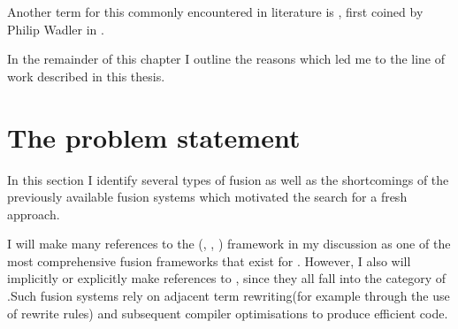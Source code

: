 \documentclass[preamble.tex]{subfiles}
\begin{document}
Another term for this commonly encountered in literature is , first coined by Philip Wadler in \cite{Wad90}.


In the remainder of this chapter I outline the reasons which led me to the line of work described in this thesis.








\clearpage
\section{The problem statement}

In this section I identify several types of fusion as well as the shortcomings of the previously available fusion systems which motivated the search for a fresh approach.

I will make many references to the \StreamFusion\istreamfusion (\cite{CLS07}, \cite{CSL06}, \cite{VectorStreamFusion}) framework in my discussion as one of the most comprehensive fusion frameworks that exist for \Haskell. However, I also will implicitly or explicitly make references to  \cite{GLP93},  \cite{CK01} since they all fall into the category of .\ieqfusion Such fusion systems rely on adjacent term rewriting\irw (for example through the use of rewrite rules\irwrules \cite{PTH01}) and subsequent compiler optimisations to produce efficient code.
\end{document}
